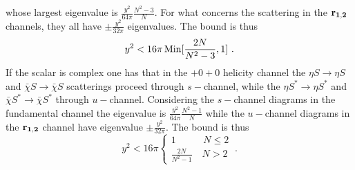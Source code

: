 \documentclass[a4paper,11pt]{article}
\newcommand{\be}{\begin{equation}}
\newcommand{\ee}{\end{equation}}
\begin{document}
whose largest eigenvalue is $\frac{y^2}{64\pi}\frac{N^2-3}{N}$. For what concerns the scattering in the ${\bf r_{1,2}}$ channels, they all have $\pm \frac{y^2}{32\pi}$ eigenvalues. The bound is thus
\be
y^2 < 16\pi\, {\rm Min}[\frac{2N}{N^2-3},1] \ .
\ee
If the scalar is complex one has that in the $+0+0$ helicity channel the $\eta S\to \eta S$ and $\bar \chi S\to \bar \chi S$ scatterings proceed through $s-$channel, while the $\eta S^* \to \eta S^*$ and $\bar \chi S^*\to \bar\chi S^*$ through $u-$channel. Considering the $s-$channel diagrams in the fundamental channel the eigenvalue is $\frac{y^2}{64\pi}\frac{N^2-1}{N}$ while the $u-$channel diagrams in the ${\bf r_{1,2}}$ channel have eigenvalue $\pm \frac{y^2}{32\pi}$.
The bound is thus
\be
y^2 <16 \pi
\begin{cases}
1\, \,\,\, \, \qquad N \le 2 \\
\frac{2N}{N^2-1} \quad N > 2
\end{cases} \ .
\ee
\end{document}
